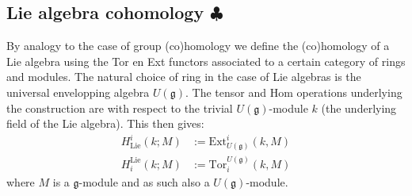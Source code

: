 \subsection{\texorpdfstring{Lie algebra cohomology $\clubsuit$}{Lie algebra cohomology}}


    By analogy to the case of group (co)homology we define the (co)homology of a Lie algebra using the Tor en Ext functors associated to a certain category of rings and modules. The natural choice of ring in the case of Lie algebras is the universal envelopping algebra $U(\mathfrak{g})$. The tensor and Hom operations underlying the construction are with respect to the trivial $U(\mathfrak{g})$-module $k$ (the underlying field of the Lie algebra). This then gives:
    \begin{align}
        H^i_{\text{Lie}}(k;M) &:= \text{Ext}^i_{U(\mathfrak{g})}(k,M)\\
        H_i^{\text{Lie}}(k;M) &:= \text{Tor}_i^{U(\mathfrak{g})}(k,M)
    \end{align}
    where $M$ is a $\mathfrak{g}$-module and as such also a $U(\mathfrak{g})$-module.

